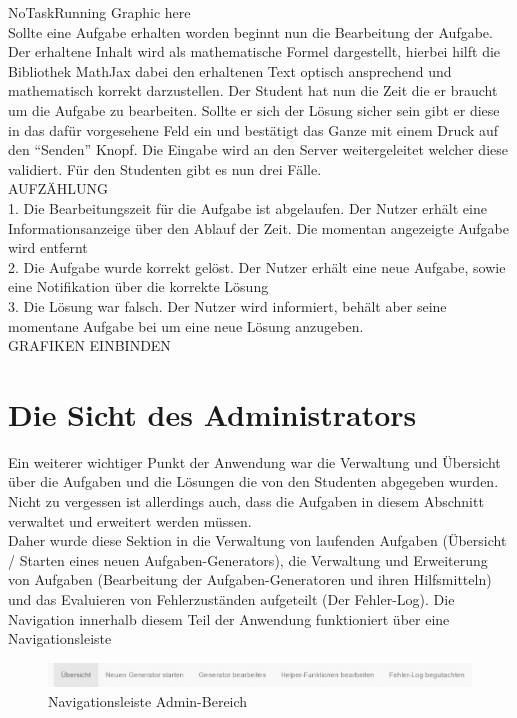NoTaskRunning Graphic here \\

Sollte eine Aufgabe erhalten worden beginnt nun die Bearbeitung der Aufgabe. Der erhaltene Inhalt wird als mathematische Formel dargestellt, hierbei hilft die Bibliothek MathJax dabei den erhaltenen Text optisch ansprechend und mathematisch korrekt darzustellen. Der Student hat nun die Zeit die er braucht um die Aufgabe zu bearbeiten. Sollte er sich der Lösung sicher sein gibt er diese in das dafür vorgesehene Feld ein und bestätigt das Ganze mit einem Druck auf den ``Senden'' Knopf. Die Eingabe wird an den Server weitergeleitet welcher diese validiert. Für den Studenten gibt es nun drei Fälle. \\
AUFZÄHLUNG \\
1. Die Bearbeitungszeit für die Aufgabe ist abgelaufen. Der Nutzer erhält eine Informationsanzeige über den Ablauf der Zeit. Die momentan angezeigte Aufgabe wird entfernt \\
2. Die Aufgabe wurde korrekt gelöst. Der Nutzer erhält eine neue Aufgabe, sowie eine Notifikation über die korrekte Lösung \\
3. Die Lösung war falsch. Der Nutzer wird informiert, behält aber seine momentane Aufgabe bei um eine neue Lösung anzugeben. \\

GRAFIKEN EINBINDEN \\




\section{Die Sicht des Administrators}

Ein weiterer wichtiger Punkt der Anwendung war die Verwaltung und Übersicht über die Aufgaben und die Lösungen die von den Studenten abgegeben wurden. Nicht zu vergessen ist allerdings auch, dass die Aufgaben in diesem Abschnitt verwaltet und erweitert werden müssen. \\
Daher wurde diese Sektion in die Verwaltung von laufenden Aufgaben (Übersicht / Starten eines neuen Aufgaben-Generators), die Verwaltung und Erweiterung von Aufgaben (Bearbeitung der Aufgaben-Generatoren und ihren Hilfsmitteln) und das Evaluieren von Fehlerzuständen aufgeteilt (Der Fehler-Log). Die Navigation innerhalb diesem Teil der Anwendung funktioniert über eine Navigationsleiste \\
\begin{figure}[htp]     %
\centering
\includegraphics[width=1\textwidth]{bilder/NavBar} 
\caption[Navigationsleiste Admin-Bereich]{Navigationsleiste Admin-Bereich}
\end{figure} 

